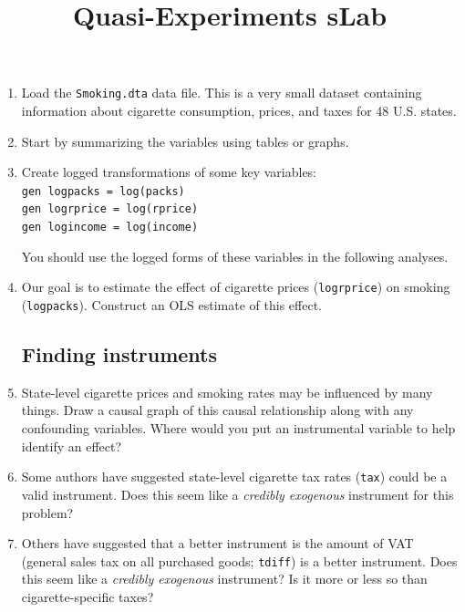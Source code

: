 \documentclass[a4paper,12pt]{article}
\title{Quasi-Experiments sLab}
\author{}
\date{}
\begin{document}
\maketitle

\vspace{-4em}

\begin{enumerate}\itemsep0.5em

\section*{Instrumental Variables}

\item Load the \texttt{Smoking.dta} data file. This is a very small dataset containing information about cigarette consumption, prices, and taxes for 48 U.S. states.

\item Start by summarizing the variables using tables or graphs.

\item Create logged transformations of some key variables:\\
\texttt{gen logpacks = log(packs)\\
gen logrprice = log(rprice)\\
gen logincome = log(income)}

You should use the logged forms of these variables in the following analyses.

\item Our goal is to estimate the effect of cigarette prices (\texttt{logrprice}) on smoking (\texttt{logpacks}). Construct an OLS estimate of this effect.

\subsection*{Finding instruments}

\item State-level cigarette prices and smoking rates may be influenced by many things. Draw a causal graph of this causal relationship along with any confounding variables. Where would you put an instrumental variable to help identify an effect?

\item Some authors have suggested state-level cigarette tax rates (\texttt{tax}) could be a valid instrument. Does this seem like a {\em credibly exogenous} instrument for this problem?

\item Others have suggested that a better instrument is the amount of VAT (general sales tax on all purchased goods; \texttt{tdiff}) is a better instrument. Does this seem like a {\em credibly exogenous} instrument? Is it more or less so than cigarette-specific taxes?


\end{enumerate}
\end{document}

